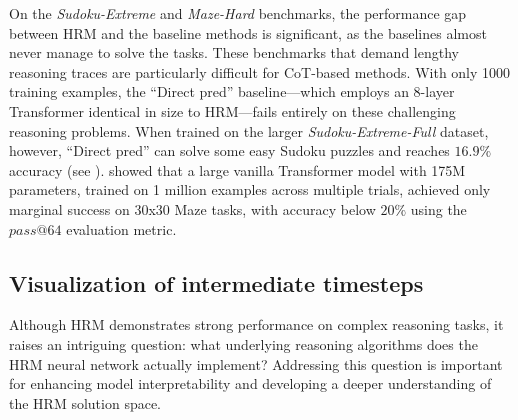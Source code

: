 On the \textit{Sudoku-Extreme} and \textit{Maze-Hard} benchmarks, the performance gap between HRM and the baseline methods is significant, as the baselines almost never manage to solve the tasks. These benchmarks that demand lengthy reasoning traces are particularly difficult for CoT-based methods. With only 1000 training examples, the ``Direct pred'' baseline---which employs an 8-layer Transformer identical in size to HRM---fails entirely on these challenging reasoning problems. When trained on the larger \textit{Sudoku-Extreme-Full} dataset, however, ``Direct pred'' can solve some easy Sudoku puzzles and reaches $16.9\%$ accuracy (see ). \citet{searchformer2024} showed that a large vanilla Transformer model with 175M parameters, trained on 1 million examples across multiple trials, achieved only marginal success on 30x30 Maze tasks, with accuracy below $20\%$ using the $pass@64$ evaluation metric.



\subsection{Visualization of intermediate timesteps}








Although HRM demonstrates strong performance on complex reasoning tasks, it raises an intriguing question: what underlying reasoning algorithms does the HRM neural network actually implement? Addressing this question is important for enhancing model interpretability and developing a deeper understanding of the HRM solution space. 

